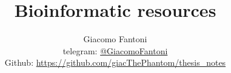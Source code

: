 

\title{\Huge\textbf{Bioinformatic resources}}

\author{
  Giacomo Fantoni \\
  \small telegram: \href{https://t.me/GiacomoFantoni}{@GiacomoFantoni} \\[3pt]
\small Github: \href{https://github.com/giacThePhantom/thesis_notes}{https://github.com/giacThePhantom/thesis\_notes}}


\maketitle
\tableofcontents


